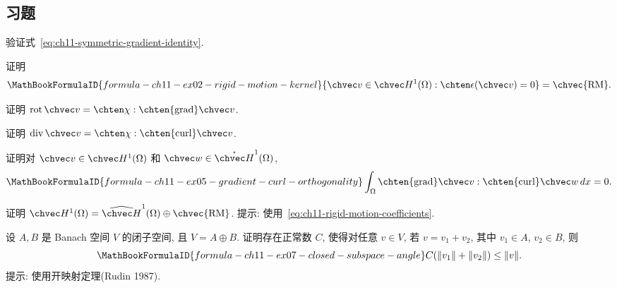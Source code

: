 \subsection{习题}
\label{sec:ch11-exercises}
\setcounter{exerciseitem}{0}

\begin{MBExercise}
\label{exr:ch11-identity-symmetric-gradient}
验证式~\eqref{eq:ch11-symmetric-gradient-identity}.
\end{MBExercise}

\begin{MBExercise}
\label{exr:ch11-rigid-motion-kernel}
证明
\[
\MathBookFormulaID{formula-ch11-ex02-rigid-motion-kernel}
\{\chvec v\in\chvec H^1(\Omega):\chten\epsilon(\chvec v)=0\}
=\chvec{\mathrm{RM}}.
\]
\end{MBExercise}

\begin{MBExercise}
\label{exr:ch11-03}
证明 $\operatorname{rot}\chvec v=\chten\chi:\chten{\operatorname{grad}}\chvec v$.
\end{MBExercise}

\begin{MBExercise}
\label{exr:ch11-04}
证明 $\operatorname{div}\chvec v=\chten\chi:\chten{\operatorname{curl}}\chvec v$.
\end{MBExercise}

\begin{MBExercise}
\label{exr:ch11-05}
证明对 $\chvec v\in\chvec H^1(\Omega)$ 和 $\chvec w\in\mathring{\chvec H}^1(\Omega)$,
\[
\MathBookFormulaID{formula-ch11-ex05-gradient-curl-orthogonality}
\int_\Omega\chten{\operatorname{grad}}\chvec v:
\chten{\operatorname{curl}}\chvec w\,dx=0.
\]
\end{MBExercise}

\begin{MBExercise}
\label{exr:ch11-h1-rm-decomposition}
证明 $\chvec H^1(\Omega)=\widehat{\chvec H}^1(\Omega)\oplus\chvec{\mathrm{RM}}$.
提示: 使用~\eqref{eq:ch11-rigid-motion-coefficients}.
\end{MBExercise}

\begin{MBExercise}
\label{exr:ch11-closed-subspace-angle}
设 $A,B$ 是 Banach 空间 $V$ 的闭子空间, 且 $V=A\oplus B$. 证明存在正常数 $C$, 使得对任意 $v\in V$, 若 $v=v_1+v_2$, 其中 $v_1\in A$, $v_2\in B$, 则
\[
\MathBookFormulaID{formula-ch11-ex07-closed-subspace-angle}
C(\|v_1\|+\|v_2\|)\leq\|v\|.
\]
提示: 使用开映射定理(Rudin 1987).
\end{MBExercise}

